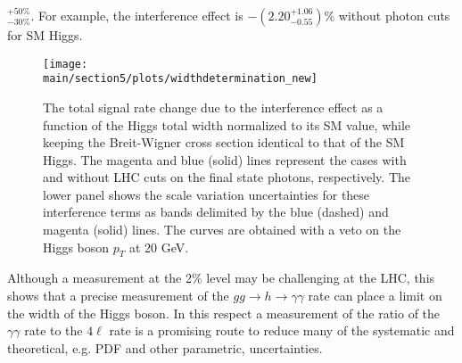 $^{+50\%}_{-30\%}$. For example, the interference effect is $-(2.20^{+1.06}_{-0.55})\%$ without photon cuts for SM Higgs.
%
\begin{figure}[htbp]
\begin{center}
\texttt{[image: \\main/section5/plots/widthdetermination\_new]}
\caption{
The total signal rate change due to the interference effect as a function of the Higgs total width normalized to its SM value, while keeping
the Breit-Wigner cross section identical to that of the SM Higgs. The magenta and blue (solid) lines represent the cases with and without LHC cuts
on the final state photons, respectively. The lower panel shows the scale variation uncertainties for these interference terms  as bands delimited by the blue (dashed)
 and magenta (solid) lines. The curves are obtained with a veto on the Higgs boson $p_T$  at 20 GeV. 
}
\label{fig:width}
\end{center}

\end{figure}
%
Although a measurement at the 2\% level may be challenging at the LHC, 
this shows that a precise measurement of the $gg\to h \to \gamma\gamma$ rate can place a limit on the width of the Higgs boson. 
In this respect a measurement of the ratio of the $\gamma\gamma$ rate to the $4\ell$ rate is a promising route to reduce many of the systematic and theoretical, e.g. PDF and other parametric, uncertainties.

